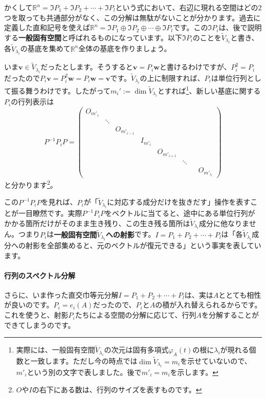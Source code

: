 かくして$\mathbb{R}^n = \Im P_1 + \Im P_2 + \cdots + \Im P_l$という式において、右辺に現れる空間はどの$2$つを取っても共通部分がなく、この分解は無駄がないことが分かります。過去に定義した直和記号を使えば$\mathbb{R}^n = \Im P_1 \oplus \Im P_2 \oplus \cdots \oplus \Im P_l$です。この$\Im P_i$は、後で説明する\textbf{一般固有空間}と呼ばれるものになっています。以下$\Im P_i$のことを$\tilde{V}_{\lambda_i}$と書き、各$\tilde{V}_{\lambda_i}$の基底を集めて$\mathbb{R}^n$全体の基底を作りましょう。

いま$\bm{v} \in \tilde{V}_{\lambda_i}$だったとします。そうすると$\bm{v} = P_i \bm{w}$と書けるわけですが、$P_i^2 = P_i$だったので$P_i \bm{v} = P_i^2 \bm{w} = P_i \bm{w} = \bm{v}$です。$\tilde{V}_{\lambda_i}$の上に制限すれば、$P_i$は単位行列として振る舞うわけです。したがって$m_i' := \dim \tilde{V}_{\lambda_i}$とすれば\footnote{実際には、一般固有空間$\tilde{V}_{\lambda_i}$の次元は固有多項式$\varphi_A(t)$の根に$\lambda_i$が現れる個数と一致します。ただし今の時点では$\dim \tilde{V}_{\lambda_i} = m_i$を示せていないので、$m'_i$という別の文字で表しました。後で$m'_i = m_i$を示します。}、新しい基底に関する$P_i$の行列表示は
\[
P^{-1} P_i P =
\begin{pmatrix}
O_{m'_1} \\
& \ddots \\
& & O_{m'_{i - 1}} \\
& & & I_{m'_i} \\
& & & & O_{m'_{i + 1}} \\
& & & & & \ddots \\
& & & & & & & O_{m'_{i_l}}
\end{pmatrix}
\]
と分かります\footnote{$O$や$I$の右下にある数は、行列のサイズを表すものです。}。

この$P^{-1} P_i P$を見れば、$P_i$が「$\tilde{V}_{\lambda_i}$に対応する成分だけを抜きだす」操作を表すことが一目瞭然です。実際$P^{-1} P_i P$をベクトルに当てると、途中にある単位行列がかかる箇所だけがそのまま生き残り、この生き残る箇所は$\tilde{V}_{\lambda_i}$成分に他なりません。つまり$P_i$は\textbf{一般固有空間$\tilde{V}_{\lambda_i}$への射影}です。$I = P_1 + P_2 + \cdots + P_l$は「各$\tilde{V}_{\lambda_i}$成分への射影を全部集めると、元のベクトルが復元できる」という事実を表しています。

\paragraph{行列のスペクトル分解}

さらに、いま作った直交巾等元分解$I = P_1 + P_2 + \cdots + P_l$は、実は$A$ととても相性が良いのです。$P_i = e_i(A)$だったので、$P_i$と$A$の積が入れ替えられるからです。これを使うと、射影$P_i$たちによる空間の分解に応じて、行列$A$を分解することができてしまうのです。

